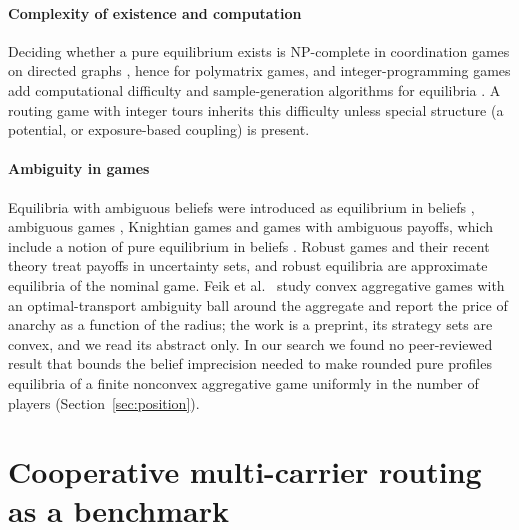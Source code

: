 \documentclass[preprint,12pt]{elsarticle}
\begin{document}
\paragraph{Complexity of existence and computation} Deciding whether a pure equilibrium exists is NP-complete in coordination games on directed graphs \cite{Apt2022}, hence for polymatrix games, and integer-programming games add computational difficulty and sample-generation algorithms for equilibria \cite{Carvalho2022}. A routing game with integer tours inherits this difficulty unless special structure (a potential, or exposure-based coupling) is present.

\paragraph{Ambiguity in games} Equilibria with ambiguous beliefs were introduced as equilibrium in beliefs \cite{Lo1996}, ambiguous games \cite{Marinacci2000}, Knightian games \cite{Stauber2011} and games with ambiguous payoffs, which include a notion of pure equilibrium in beliefs \cite{Beauchene2016}. Robust games \cite{Aghassi2006} and their recent theory \cite{Crespi2025} treat payoffs in uncertainty sets, and robust equilibria are approximate equilibria of the nominal game. Feik et al.\ \cite{Feik2026} study convex aggregative games with an optimal-transport ambiguity ball around the aggregate and report the price of anarchy as a function of the radius; the work is a preprint, its strategy sets are convex, and we read its abstract only. In our search we found no peer-reviewed result that bounds the belief imprecision needed to make rounded pure profiles equilibria of a finite nonconvex aggregative game uniformly in the number of players (Section~\ref{sec:position}).

\section{Cooperative multi-carrier routing as a benchmark}\label{sec:coop}
\end{document}
